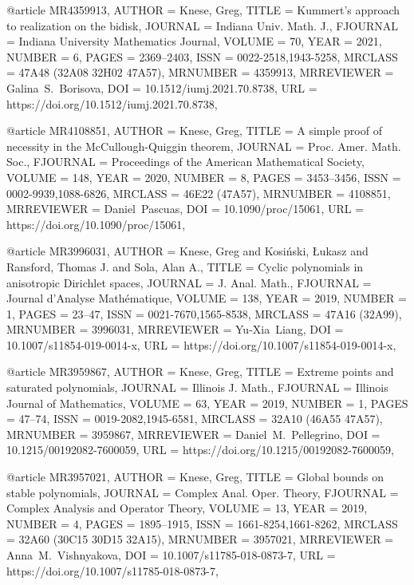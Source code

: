 @article {MR4359913,
    AUTHOR = {Knese, Greg},
     TITLE = {Kummert's approach to realization on the bidisk},
   JOURNAL = {Indiana Univ. Math. J.},
  FJOURNAL = {Indiana University Mathematics Journal},
    VOLUME = {70},
      YEAR = {2021},
    NUMBER = {6},
     PAGES = {2369--2403},
      ISSN = {0022-2518,1943-5258},
   MRCLASS = {47A48 (32A08 32H02 47A57)},
  MRNUMBER = {4359913},
MRREVIEWER = {Galina\ S.\ Borisova},
       DOI = {10.1512/iumj.2021.70.8738},
       URL = {https://doi.org/10.1512/iumj.2021.70.8738},
}

@article {MR4108851,
    AUTHOR = {Knese, Greg},
     TITLE = {A simple proof of necessity in the {M}c{C}ullough-{Q}uiggin
              theorem},
   JOURNAL = {Proc. Amer. Math. Soc.},
  FJOURNAL = {Proceedings of the American Mathematical Society},
    VOLUME = {148},
      YEAR = {2020},
    NUMBER = {8},
     PAGES = {3453--3456},
      ISSN = {0002-9939,1088-6826},
   MRCLASS = {46E22 (47A57)},
  MRNUMBER = {4108851},
MRREVIEWER = {Daniel\ Pascuas},
       DOI = {10.1090/proc/15061},
       URL = {https://doi.org/10.1090/proc/15061},
}

@article {MR3996031,
    AUTHOR = {Knese, Greg and Kosi\'nski, \L ukasz and Ransford, Thomas J.
              and Sola, Alan A.},
     TITLE = {Cyclic polynomials in anisotropic {D}irichlet spaces},
   JOURNAL = {J. Anal. Math.},
  FJOURNAL = {Journal d'Analyse Math\'ematique},
    VOLUME = {138},
      YEAR = {2019},
    NUMBER = {1},
     PAGES = {23--47},
      ISSN = {0021-7670,1565-8538},
   MRCLASS = {47A16 (32A99)},
  MRNUMBER = {3996031},
MRREVIEWER = {Yu-Xia\ Liang},
       DOI = {10.1007/s11854-019-0014-x},
       URL = {https://doi.org/10.1007/s11854-019-0014-x},
}

@article {MR3959867,
    AUTHOR = {Knese, Greg},
     TITLE = {Extreme points and saturated polynomials},
   JOURNAL = {Illinois J. Math.},
  FJOURNAL = {Illinois Journal of Mathematics},
    VOLUME = {63},
      YEAR = {2019},
    NUMBER = {1},
     PAGES = {47--74},
      ISSN = {0019-2082,1945-6581},
   MRCLASS = {32A10 (46A55 47A57)},
  MRNUMBER = {3959867},
MRREVIEWER = {Daniel\ M.\ Pellegrino},
       DOI = {10.1215/00192082-7600059},
       URL = {https://doi.org/10.1215/00192082-7600059},
}

@article {MR3957021,
    AUTHOR = {Knese, Greg},
     TITLE = {Global bounds on stable polynomials},
   JOURNAL = {Complex Anal. Oper. Theory},
  FJOURNAL = {Complex Analysis and Operator Theory},
    VOLUME = {13},
      YEAR = {2019},
    NUMBER = {4},
     PAGES = {1895--1915},
      ISSN = {1661-8254,1661-8262},
   MRCLASS = {32A60 (30C15 30D15 32A15)},
  MRNUMBER = {3957021},
MRREVIEWER = {Anna\ M.\ Vishnyakova},
       DOI = {10.1007/s11785-018-0873-7},
       URL = {https://doi.org/10.1007/s11785-018-0873-7},
}

